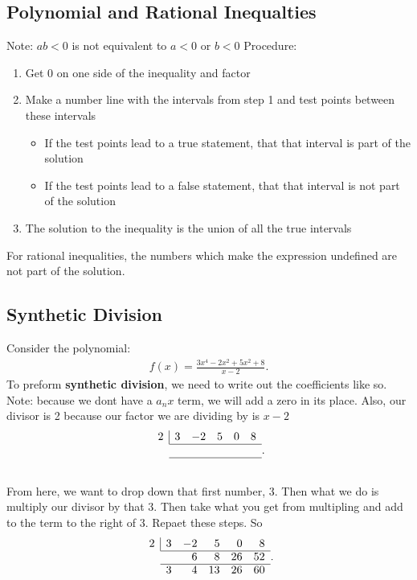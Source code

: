 \documentclass{report}
\begin{document}
    \subsection{Polynomial and Rational Inequalties}
    Note: $ab < 0$ is not equivalent to $a< 0 $ or $b <0  $
    \bigbreak \noindent 
    Procedure:
    \begin{enumerate}
      \item Get 0 on one side of the inequality and factor
      \item Make a number line with the intervals from step 1 and test points between these intervals
        \begin{itemize}
          \item If the test points lead to a true statement, that that interval is part of the solution 
          \item If the test points lead to a false statement, that that interval is not part of the solution 
        \end{itemize}
      \item The solution to the inequality is the union of all the true intervals
    \end{enumerate}
    \bigbreak \noindent 
    For rational inequalities, the numbers which make the expression undefined are not part of the solution.

    \bigbreak \noindent \bigbreak \noindent 
    \subsection{Synthetic Division}
    Consider the polynomial:
    \begin{align*}
      f(x) = \frac{3x^{4} -2x^{2} +5x^{2}  + 8}{x-2}
    .\end{align*}
    \bigbreak \noindent 
    To preform \textbf{synthetic division}, we need to write out the coefficients like so. Note: because we dont have a $a_{n}x$ term, we will add a zero in its place. Also, our divisor is 2 because our factor we are dividing by is $x-2$
    \begin{align*}
      \begin{array}{rrrrrr}
        \multicolumn{1}{r|}{2} & {3} & -2 & 5 & 0 & 8 \\ \cline{2-6}
       & & &  &  \\ \cline{2-6}
       &  &  &  &  
      \end{array}
    .\end{align*}

  \bigbreak \noindent 
  From here, we want to drop down that first number, $3$. Then what we do is multiply our divisor by that $3$. Then take what you get from multipling and add to the term to the right of 3. Repaet these steps.
  \bigbreak \noindent 
  So
    \begin{align*}
      \begin{array}{rrrrrr}
        \multicolumn{1}{r|}{2} & {3} & -2 & 5 & 0 & 8 \\ \cline{2-6}
         &  & 6 & 8 & 26 & 52\\ \cline{2-6}
         &3  & 4  & 13 & 26 & 60
      \end{array}
    .\end{align*}
\end{document}
